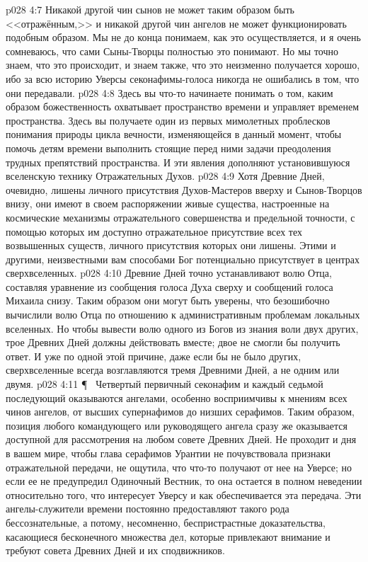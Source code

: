 \vs p028 4:7 Никакой другой чин сынов не может таким образом быть <<отражённым,>> и никакой другой чин ангелов не может функционировать подобным образом. Мы не до конца понимаем, как это осуществляется, и я очень сомневаюсь, что сами Сыны\hyp{}Творцы полностью это понимают. Но мы точно знаем, что это происходит, и знаем также, что это неизменно получается хорошо, ибо за всю историю Уверсы секонафимы\hyp{}голоса никогда не ошибались в том, что они передавали.
\vs p028 4:8 Здесь вы что\hyp{}то начинаете понимать о том, каким образом божественность охватывает пространство времени и управляет временем пространства. Здесь вы получаете один из первых мимолетных проблесков понимания природы цикла вечности, изменяющейся в данный момент, чтобы помочь детям времени выполнить стоящие перед ними задачи преодоления трудных препятствий пространства. И эти явления дополняют установившуюся вселенскую технику Отражательных Духов.
\vs p028 4:9 Хотя Древние Дней, очевидно, лишены личного присутствия Духов\hyp{}Мастеров вверху и Сынов\hyp{}Творцов внизу, они имеют в своем распоряжении живые существа, настроенные на космические механизмы отражательного совершенства и предельной точности, с помощью которых им доступно отражательное присутствие всех тех возвышенных существ, личного присутствия которых они лишены. Этими и другими, неизвестными вам способами Бог потенциально присутствует в центрах сверхвселенных.
\vs p028 4:10 Древние Дней точно устанавливают волю Отца, составляя уравнение из сообщения голоса Духа сверху и сообщений голоса Михаила снизу. Таким образом они могут быть уверены, что безошибочно вычислили волю Отца по отношению к административным проблемам локальных вселенных. Но чтобы вывести волю одного из Богов из знания воли двух других, трое Древних Дней должны действовать вместе; двое не смогли бы получить ответ. И уже по одной этой причине, даже если бы не было других, сверхвселенные всегда возглавляются тремя Древними Дней, а не одним или двумя.
\vs p028 4:11 \P\ \bibnobreakspace {} Четвертый первичный секонафим и каждый седьмой последующий оказываются ангелами, особенно восприимчивы к мнениям всех чинов ангелов, от высших супернафимов до низших серафимов. Таким образом, позиция любого командующего или руководящего ангела сразу же оказывается доступной для рассмотрения на любом совете Древних Дней. Не проходит и дня в вашем мире, чтобы глава серафимов Урантии не почувствовала признаки отражательной передачи, не ощутила, что что\hyp{}то получают от нее на Уверсе; но если ее не предупредил Одиночный Вестник, то она остается в полном неведении относительно того, что интересует Уверсу и как обеспечивается эта передача. Эти ангелы\hyp{}служители времени постоянно предоставляют такого рода бессознательные, а потому, несомненно, беспристрастные доказательства, касающиеся бесконечного множества дел, которые привлекают внимание и требуют совета Древних Дней и их сподвижников.
